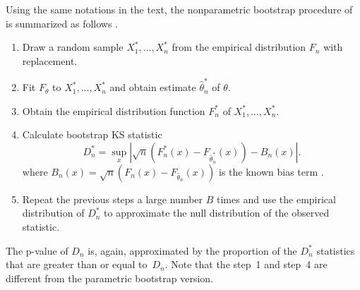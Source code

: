 \documentclass[12pt, letterpaper, titlepage]{article}
\begin{document}
Using the same notations in the text, the nonparametric bootstrap procedure of
\citet{babu2004goodness} is summarized as follows
\citep{babu2004goodness}.
\begin{enumerate}
\item
  Draw a random sample $X_1^*,...,X_n^*$ from the empirical distribution $F_n$
  with replacement.
\item
  Fit $F_\theta$ to $X_1^*,...,X_n^*$ and obtain estimate 
	$\hat\theta_n^*$ of $\theta$.
\item
  Obtain the empirical distribution function $F_n^*$ of
  $X_1^*, \ldots,  X_n^*$. 
\item
  Calculate bootstrap KS statistic
  \[
    D_n^* = \sup_x | \sqrt{n}\left(F_n^* (x)- F_{\hat\theta_n^*}(x)\right) - B_n(x) |.
  \]
  where $B_{n}(x) = \sqrt{n}(F_{n}(x) - F_{\hat\theta_n}(x))$ is the known
  bias term \citep{babu2004goodness}.
\item
  Repeat the previous steps a large number $B$ times and use the empirical
  distribution of $D_n^*$ to approximate the null distribution of the observed
  statistic. 
\end{enumerate}
The p-value of $D_n$ is, again, approximated by the proportion of the $D_n^*$
statistics that are greater than or equal to~$D_n$. Note that the step~1 and
step~4 are different from the parametric bootstrap version.



\end{document}
